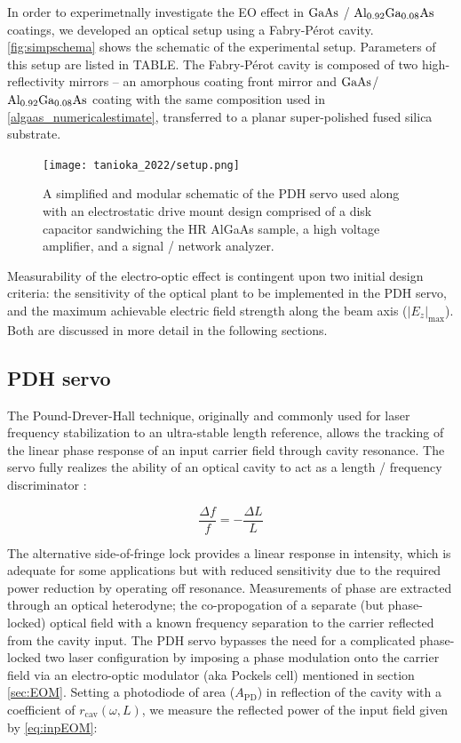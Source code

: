 In order to experimetnally investigate the EO effect in $\mathrm{GaAs}$ / $\mathrm{Al_{0.92}Ga_{0.08}As}$ coatings, we developed an optical setup using a Fabry-P\'erot cavity. \autoref{fig:simpschema} shows the schematic of the experimental setup. Parameters of this setup are listed in TABLE. The Fabry-P\'erot cavity is composed of two high-reflectivity mirrors -- an amorphous coating front mirror and $\mathrm{GaAs}$/$\mathrm{Al_{0.92}Ga_{0.08}As}$ coating with the same composition used in \autoref{algaas_numericalestimate}, transferred to a planar super-polished fused silica substrate. 

\begin{figure}[H]
    \centering
	\texttt{[image: tanioka\_2022/setup.png]}
	\caption{A simplified and modular schematic of the PDH servo used along with an electrostatic drive mount design comprised of a disk capacitor sandwiching the HR AlGaAs sample, a high voltage amplifier, and a signal / network analyzer.}
\label{fig:simpschema}
\end{figure}
 Measurability of the electro-optic effect is contingent upon two initial design criteria: the sensitivity of the optical plant to be implemented in the PDH servo, and the maximum achievable electric field strength along the beam axis ($|E_z|_\mathrm{max}$). Both are discussed in more detail in the following sections. 

\subsection{PDH servo}\label{subsubsec:pdh}
The Pound-Drever-Hall technique, originally and commonly used for laser frequency stabilization to an ultra-stable length reference, allows the tracking of the linear phase response of an input carrier field through cavity resonance. The servo fully realizes the ability of an optical cavity to act as a length / frequency discriminator \cite{pound_drever_hall:1983}:

\begin{equation}\label{eq:cavlf}
	\frac{\Delta f}{f} = -\frac{\Delta L}{L}
\end{equation}

\noindent The alternative side-of-fringe lock provides a linear response in intensity, which is adequate for some applications but with reduced sensitivity due to the required power reduction by operating off resonance. Measurements of phase are extracted through an optical heterodyne; the co-propogation of a separate (but phase-locked) optical field with a known frequency separation to the carrier reflected from the cavity input. The PDH servo bypasses the need for a complicated phase-locked two laser configuration by imposing a phase modulation onto the carrier field via an electro-optic modulator (aka Pockels cell) mentioned in section \autoref{sec:EOM}. Setting a photodiode of area ($A_\mathrm{PD}$) in reflection of the cavity with a coefficient of $r_\mathrm{cav}(\omega,L)$, we measure the reflected power of the input field given by \autoref{eq:inpEOM}\;\cite{black:pdh}:

